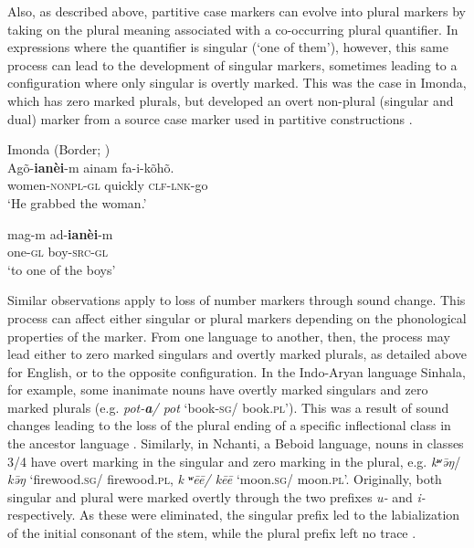 \documentclass[output=paper]{langsci/langscibook}
\begin{document}
Also, as described above, partitive case markers can evolve into plural markers by
taking on the plural meaning associated with a co-occurring plural
quantifier. In expressions where the quantifier is singular (`one of
them'), however, this same process can lead to the development of
singular markers, sometimes leading to a configuration where only singular
is overtly marked. This was the case in Imonda, which has zero marked plurals, but developed
an overt non-plural
(singular and dual) marker
 from a source case marker used in partitive constructions .

\ea\label{imonda2}
Imonda (Border; )\\
\ea
\gll Agõ-\textbf{{ianèi}}-m ainam fa-i-kõhõ.\\
women-\textsc{nonpl-gl} quickly \textsc{clf-lnk}-go\\
\glt `He grabbed the woman.' 

\ex
\gll mag-m ad-\textbf{{ianèi}}-m \\
one-\textsc{gl} boy-\textsc{src-gl} \\
\glt `to one of the boys'


\z
\z


Similar observations apply to loss of number markers through sound
change. This process can affect
either singular or plural markers depending on the phonological
properties of the marker. From one language to another, then, the process may lead either to  zero marked singulars and
overtly marked plurals, as detailed above for
English, or to the opposite configuration. In the
Indo-Aryan language Sinhala,  for example, some inanimate nouns have
overtly marked singulars and
zero marked plurals
 (e.g. {\em pot-\textbf{\textit {a}}/ pot} `book-\textsc{sg}/ book.\textsc{pl}'). This was a result of
 sound changes leading to the loss of the plural ending of a specific inflectional class in the ancestor language
 \citealt[250--256]{NitzNordhoff2010}. Similarly, in Nchanti, a Beboid
 language, nouns in classes 3/4 have overt
  marking in the singular and zero marking in the plural, e.g. {\em
    k{\bf ʷ}\=əŋ}/ {\em
    k\=əŋ} `firewood.\textsc{sg}/ firewood.\textsc{pl}, {\em k{\bf
      ʷ}ēē/ kēē} `moon.\textsc{sg}/ moon.\textsc{pl}'.
  Originally, both singular and plural were marked overtly through the
  two prefixes {\em *u-} and {\em *i-} respectively. As these were
  eliminated, the singular prefix led to the labialization of the
  initial consonant of the stem, while the plural prefix left no trace
  \citep{Hombert1980}.
\end{document}
